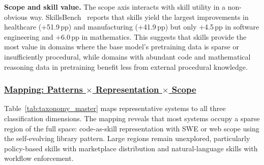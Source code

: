 \documentclass[conference, compsoc]{IEEEtran}
\theoremstyle{plain}
\newcommand{\para}[1]{\smallskip\noindent\textbf{#1.}}
\begin{document}
\para{Scope and skill value} The scope axis interacts with skill utility in a non-obvious way. SkillsBench~\cite{skillsbench2025} reports that skills yield the largest improvements in healthcare (+51.9\,pp) and manufacturing (+41.9\,pp) but only +4.5\,pp in software engineering and +6.0\,pp in mathematics. This suggests that skills provide the most value in domains where the base model's pretraining data is sparse or insufficiently procedural, while domains with abundant code and mathematical reasoning data in pretraining benefit less from external procedural knowledge.

\subsubsection{\underline{Mapping: Patterns $\times$ Representation $\times$ Scope}}
\label{sec:taxonomy:mapping}

Table~\ref{tab:taxonomy_master} maps representative systems to all three classification dimensions. The mapping reveals that most systems occupy a sparse region of the full space: code-as-skill representation with SWE or web scope using the self-evolving library pattern. Large regions remain unexplored, particularly policy-based skills with marketplace distribution and natural-language skills with workflow enforcement.
\end{document}
